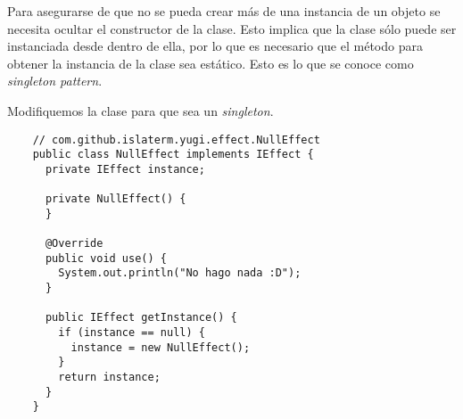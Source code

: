 \begin{Answer}[ref={ex:singleton-1}]
  Para asegurarse de que no se pueda crear más de una instancia de un objeto se necesita
  ocultar el constructor de la clase.
  Esto implica que la clase sólo puede ser instanciada desde dentro de ella, por lo que es
  necesario que el método para obtener la instancia de la clase sea estático.
  Esto es lo que se conoce como \textit{singleton pattern}.

  Modifiquemos la clase  para que sea un \textit{singleton}.
  \begin{verbatim}
    // com.github.islaterm.yugi.effect.NullEffect
    public class NullEffect implements IEffect {
      private IEffect instance;

      private NullEffect() {
      }

      @Override
      public void use() {
        System.out.println("No hago nada :D");
      }
      
      public IEffect getInstance() {
        if (instance == null) {
          instance = new NullEffect();
        }
        return instance;
      }
    }
  \end{verbatim}
\end{Answer}